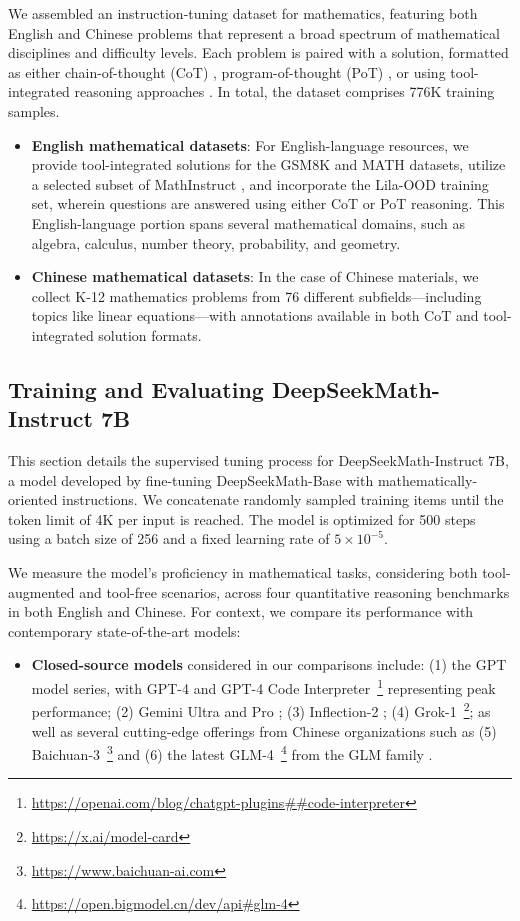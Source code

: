 We assembled an instruction-tuning dataset for mathematics, featuring both English and Chinese problems that represent a broad spectrum of mathematical disciplines and difficulty levels. Each problem is paired with a solution, formatted as either chain-of-thought (CoT) \citep{cot}, program-of-thought (PoT) \citep{pot,pal}, or using tool-integrated reasoning approaches \citep{tora}. In total, the dataset comprises 776K training samples.

\begin{itemize}[topsep=0pt]
    \item \textbf{English mathematical datasets}: For English-language resources, we provide tool-integrated solutions for the GSM8K and MATH datasets, utilize a selected subset of MathInstruct \citep{MathInstruct}, and incorporate the Lila-OOD \citep{lila} training set, wherein questions are answered using either CoT or PoT reasoning. This English-language portion spans several mathematical domains, such as algebra, calculus, number theory, probability, and geometry.
    \item \textbf{Chinese mathematical datasets}: In the case of Chinese materials, we collect K-12 mathematics problems from 76 different subfields—including topics like linear equations—with annotations available in both CoT and tool-integrated solution formats.
\end{itemize}

\subsection{Training and Evaluating DeepSeekMath-Instruct 7B}

This section details the supervised tuning process for DeepSeekMath-Instruct 7B, a model developed by fine-tuning DeepSeekMath-Base with mathematically-oriented instructions. We concatenate randomly sampled training items until the token limit of 4K per input is reached. The model is optimized for 500 steps using a batch size of 256 and a fixed learning rate of $5 \times 10^{-5}$.

We measure the model’s proficiency in mathematical tasks, considering both tool-augmented and tool-free scenarios, across four quantitative reasoning benchmarks in both English and Chinese. For context, we compare its performance with contemporary state-of-the-art models:

\begin{itemize}[topsep=0pt]
    \item \textbf{Closed-source models} considered in our comparisons include: (1) the GPT model series, with GPT-4 \citep{gpt4} and GPT-4 Code Interpreter~\footnote{\url{https://openai.com/blog/chatgpt-plugins\#\#code-interpreter}} representing peak performance; (2) Gemini Ultra and Pro \citep{gemini}; (3) Inflection-2 \citep{inflection-2}; (4) Grok-1~\footnote{\url{https://x.ai/model-card}}; as well as several cutting-edge offerings from Chinese organizations such as (5) Baichuan-3~\footnote{\url{https://www.baichuan-ai.com}} and (6) the latest GLM-4~\footnote{\url{https://open.bigmodel.cn/dev/api\#glm-4}} from the GLM family \citep{glm}.
\end{itemize}

